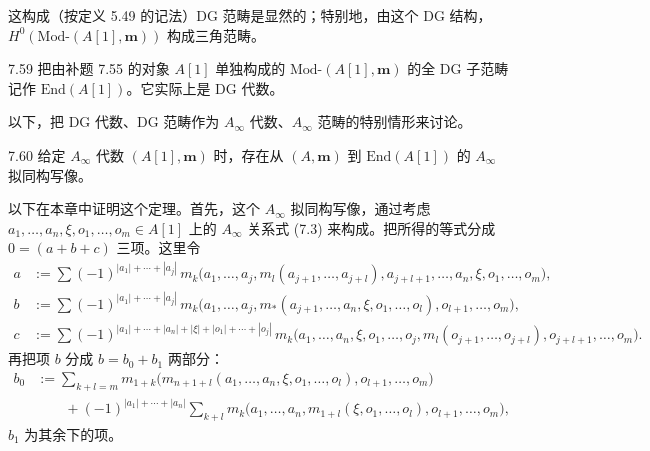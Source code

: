 这构成（按定义 5.49 的记法）DG 范畴是显然的；特别地，由这个 DG 结构，$H^{0}(\mathrm{Mod}\text{-}(A[1],\mathbf m))$ 构成三角范畴。

\begin{definition}{7.59}
把由补题 7.55 的对象 $A[1]$ 单独构成的 $\mathrm{Mod}\text{-}(A[1],\mathbf m)$ 的全 DG 子范畴记作 $\mathrm{End}(A[1])$。它实际上是 DG 代数。
\end{definition}

以下，把 DG 代数、DG 范畴作为 $A_\infty$ 代数、$A_\infty$ 范畴的特别情形来讨论。

\begin{theorem}{7.60}
给定 $A_\infty$ 代数 $(A[1],\mathbf m)$ 时，存在从 $(A,\mathbf m)$ 到 $\mathrm{End}(A[1])$ 的 $A_\infty$ 拟同构写像。
\end{theorem}

以下在本章中证明这个定理。首先，这个 $A_\infty$ 拟同构写像，通过考虑 $a_{1},\dots,a_{n},\xi,o_{1},\dots,o_{m}\in A[1]$ 上的 $A_\infty$ 关系式 (7.3) 来构成。把所得的等式分成 $0=(a+b+c)$ 三项。这里令
\begin{align*}
  a&:=\sum(-1)^{|a_{1}|+\cdots+|a_{j}|}\,m_{k}\bigl(a_{1},\dots,a_{j},m_{l}(a_{j+1},\dots,a_{j+l}),a_{j+l+1},\dots,a_{n},\xi,o_{1},\dots,o_{m}\bigr),\\
  b&:=\sum(-1)^{|a_{1}|+\cdots+|a_{j}|}\,m_{k}\bigl(a_{1},\dots,a_{j},m_{*}(a_{j+1},\dots,a_{n},\xi,o_{1},\dots,o_{l}),o_{l+1},\dots,o_{m}\bigr),\\
  c&:=\sum(-1)^{|a_{1}|+\cdots+|a_{n}|+|\xi|+|o_{1}|+\cdots+|o_{j}|}\,m_{k}\bigl(a_{1},\dots,a_{n},\xi,o_{1},\dots,o_{j},m_{l}(o_{j+1},\dots,o_{j+l}),o_{j+l+1},\dots,o_{m}\bigr).
\end{align*}
再把项 $b$ 分成 $b=b_{0}+b_{1}$ 两部分：
\begin{align*}
  b_{0}&:=\sum_{k+l=m}m_{1+k}\bigl(m_{n+1+l}(a_{1},\dots,a_{n},\xi,o_{1},\dots,o_{l}),o_{l+1},\dots,o_{m}\bigr)\\
  &\qquad+(-1)^{|a_{1}|+\cdots+|a_{n}|}\sum_{k+l}m_{k}\bigl(a_{1},\dots,a_{n},m_{1+l}(\xi,o_{1},\dots,o_{l}),o_{l+1},\dots,o_{m}\bigr),
\end{align*}
$b_{1}$ 为其余下的项。

